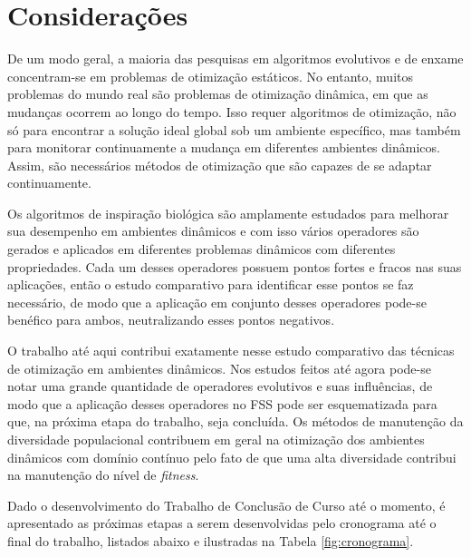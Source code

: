 \chapter{Considerações}
\label{ch:consideracoes}

De um modo geral, a maioria das pesquisas em algoritmos evolutivos e de enxame concentram-se em problemas de otimização estáticos. No entanto, muitos problemas do mundo real são problemas de otimização dinâmica, em que as mudanças ocorrem ao longo do tempo. Isso requer algoritmos de otimização, não só para encontrar a solução ideal global sob um ambiente específico, mas também para monitorar continuamente a mudança em diferentes ambientes dinâmicos. Assim, são necessários métodos de otimização que são capazes de se adaptar continuamente.

Os algoritmos de inspiração biológica são amplamente estudados para melhorar sua desempenho em ambientes dinâmicos e com isso vários operadores são gerados e aplicados em diferentes problemas dinâmicos com diferentes propriedades. Cada um desses operadores possuem pontos fortes e fracos nas suas aplicações, então o estudo comparativo para identificar esse pontos se faz necessário, de modo que a aplicação em conjunto desses operadores pode-se benéfico para ambos, neutralizando esses pontos negativos.

O trabalho até aqui contribui exatamente nesse estudo comparativo das técnicas de otimização em ambientes dinâmicos. Nos estudos feitos até agora pode-se notar uma grande quantidade de operadores evolutivos e suas influências, de modo que a aplicação desses operadores no FSS pode ser esquematizada para que, na próxima etapa do trabalho, seja concluída. Os métodos de manutenção da diversidade populacional contribuem em geral na otimização dos ambientes dinâmicos com domínio contínuo pelo fato de que uma alta diversidade contribui na manutenção do nível de \textit{fitness}.

Dado o desenvolvimento do Trabalho de Conclusão de Curso até o momento, é apresentado as próximas etapas a serem desenvolvidas pelo cronograma até o final do trabalho, listados abaixo e ilustradas na Tabela \ref{fig:cronograma}.

